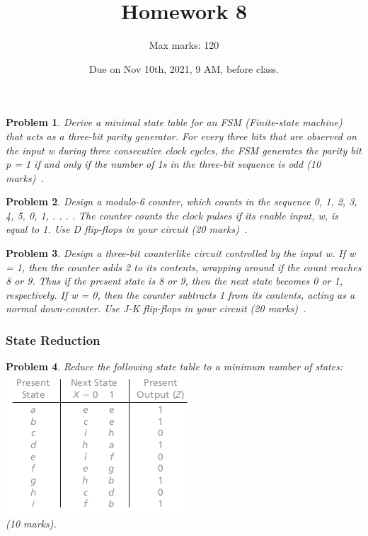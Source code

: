 \documentclass[twocolumn]{article}
\title{Homework 8}
\author{Max marks: 120}
\date{Due on Nov 10th, 2021, 9 AM, before class.}
\newtheorem{prob}{Problem}
\begin{document}
\maketitle
\begin{prob}
  Derive a minimal state table for an FSM (Finite-state machine) that acts as a
three-bit parity generator. For every three bits that are observed on the input
w during three consecutive clock cycles, the FSM generates the parity bit p = 1
if and only if the number of 1s in the three-bit sequence is odd (10
marks)~\cite[Prob 6.12]{brown2013fundamentals}.
\end{prob}

\begin{prob}
  Design a modulo-6 counter, which counts in the sequence 0, 1, 2, 3, 4, 5, 0,
1, . . . . The counter counts the clock pulses if its enable input, w, is equal
to 1. Use D flip-flops in your circuit (20 marks)~\cite[Prob 6.23]{brown2013fundamentals}.
\end{prob}


\begin{prob}
  Design a three-bit counterlike circuit controlled by the input w. If w = 1,
then the counter adds 2 to its contents, wrapping around if the count reaches 8
or 9. Thus if the present state is 8 or 9, then the next state becomes 0 or 1,
respectively. If w = 0, then the counter subtracts 1 from its contents, acting
as a normal down-counter. Use J-K flip-flops in your circuit (20
marks)~\cite[Prob 6.26]{brown2013fundamentals}.
\end{prob}

\subsubsection*{State Reduction}
\begin{prob}
  Reduce the following state table to a minimum number of states:\\
  \includegraphics[width=\linewidth]{fig-15.2.png}\\
  (10 marks).
\end{prob}
\end{document}
